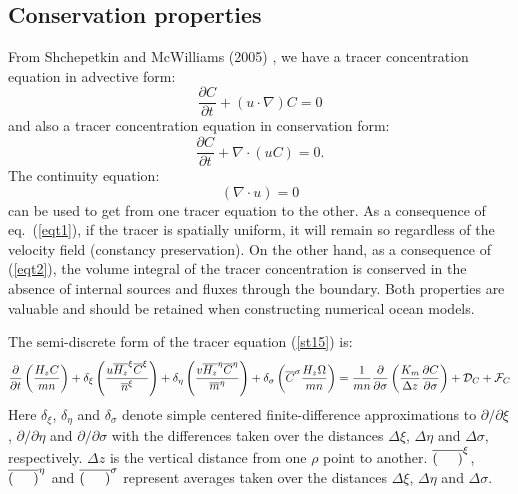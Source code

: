 \subsection{Conservation properties}
\label{Enrg}
From Shchepetkin and McWilliams (2005) \cite{SS2005}, we have a
tracer concentration equation in advective form:
\begin{equation}
  \frac{\partial C}{\partial t} + (u \cdot \nabla) C = 0
  \label{eqt1}
\end{equation}
and also a tracer concentration equation in conservation form:
\begin{equation}
   \frac{\partial C}{\partial t} + \nabla \cdot (u C) = 0.
  \label{eqt2}
\end{equation}
The continuity equation:
\begin{equation}
   ( \nabla \cdot u) = 0
\end{equation}
can be used to get from one tracer equation to the other.
As a consequence of eq.~(\ref{eqt1}), if the tracer is spatially
uniform, it will remain so regardless of the velocity field
(constancy preservation). On the other hand, as a consequence of
(\ref{eqt2}), the volume integral of the tracer concentration is conserved
in the absence of internal sources and fluxes through the boundary. Both
properties are valuable and should be retained when constructing numerical
ocean models.

The semi-discrete form of the tracer equation
(\ref{st15}) is:
\begin{equation}
   \frac{\partial}{\partial t} \left( \frac{H_z C}{m n} \right)
   + \delta_{\xi} \left(
   \frac{u \overline{H_z}^\xi \overline{C}^\xi }{\overline{n}^\xi} \right)
   + \delta_{\eta} \left(
   \frac{v \overline{H_z}^\eta \overline{C}^\eta }{\overline{m}^\eta} \right)
   + \delta_\sigma \left( \overline{C}^\sigma
   \frac{H_z \Omega}{m n} \right) =
\\ \vspace{2mm}
   \frac{ 1}{mn} \frac{\partial}{\partial \sigma}
   \left( \frac{K_m}{\Delta z} \frac{\partial C}{\partial \sigma} \right) +
   {\cal D}_C + {\cal F}_C
\label{tfull}
\end{equation}
Here $\delta_{\xi}$, $\delta_{\eta}$ and $\delta_\sigma$ denote simple
centered finite-difference approximations to $\partial / \partial \xi$,
$\partial / \partial \eta$ and $\partial / \partial \sigma$ with the
differences taken over the distances $\Delta\xi$, $\Delta\eta$ and
$\Delta \sigma$, respectively. $\Delta z$ is the vertical distance from one
$\rho$ point to another. $\overline{ ( \hspace{5mm} )}^{\xi}$,
$\overline{ ( \hspace{5mm} )}^{\eta}$ and $\overline{ ( \hspace{5mm}
)}^\sigma$ represent averages taken over the distances $\Delta\xi$, $\Delta
\eta$ and $\Delta \sigma$. %

